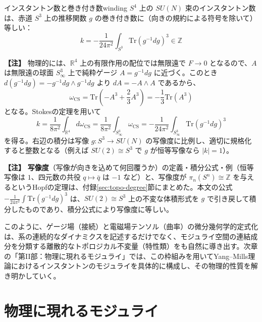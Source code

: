 \documentclass[uplatex, dvipdfmx, book]{jsbook}
\newenvironment{note}{\vspace{1ex}\par\footnotesize\noindent\textbf{【注】}}{\par\vspace{1ex}}
\begin{document}
\begin{myprop}{インスタントン数と巻き付き数}{winding}
$S^4$ 上の $SU(N)$ 束のインスタントン数は、赤道 $S^3$ 上の推移関数 $g$ の巻き付き数に（向きの規約による符号を除いて）等しい：
\begin{equation*}
    k = -\frac{1}{24\pi^2}\int_{S^3} \mathrm{Tr}\left( g^{-1}dg \right)^3 \in \mathbb{Z}
\end{equation*}
\end{myprop}

\begin{note}
物理的には、$\mathbb{R}^4$ 上の有限作用の配位では無限遠で $F \to 0$ となるので、$A$ は無限遠の球面 $S^3_\infty$ 上で純粋ゲージ $A = g^{-1}dg$ に近づく。このとき $d(g^{-1}dg) = -g^{-1}dg \wedge g^{-1}dg$ より $dA = -A \wedge A$ であるから、
\begin{equation*}
    \omega_{\text{CS}} = \mathrm{Tr}\left( -A^3 + \frac{2}{3}A^3 \right) = -\frac{1}{3}\mathrm{Tr}(A^3)
\end{equation*}
となる。Stokesの定理を用いて
\begin{equation*}
    k = \frac{1}{8\pi^2}\int_{\mathbb{R}^4} d\omega_{\text{CS}} = \frac{1}{8\pi^2}\int_{S^3_\infty} \omega_{\text{CS}} = -\frac{1}{24\pi^2}\int_{S^3_\infty} \mathrm{Tr}\left(g^{-1}dg\right)^3
\end{equation*}
を得る。右辺の積分は写像 $g: S^3 \to SU(N)$ の写像度に比例し、適切に規格化すると整数となる（例えば $SU(2) \cong S^3$ で $g$ が恒等写像なら $|k| = 1$）。
\end{note}

\begin{note}
\textbf{写像度}（写像が向きを込めて何回覆うか）の定義・積分公式・例（恒等写像は $1$、四元数の共役 $q \mapsto \bar{q}$ は $-1$ など）と、写像度が $\pi_n(S^n) \cong \mathbb{Z}$ を与えるというHopfの定理は、付録\ref{sec:topo-degree}節にまとめた。本文の公式 $-\frac{1}{24\pi^2}\int \mathrm{Tr}(g^{-1}dg)^3$ は、$SU(2) \cong S^3$ 上の不変な体積形式を $g$ で引き戻して積分したものであり、積分公式により写像度に等しい。
\end{note}

このように、ゲージ場（接続）と電磁場テンソル（曲率）の微分幾何学的定式化は、系の連続的なダイナミクスを記述するだけでなく、モジュライ空間の連結成分を分類する離散的なトポロジカル不変量（特性類）をも自然に導き出す。次章の「第II部：物理に現れるモジュライ」では、この枠組みを用いてYang--Mills理論におけるインスタントンのモジュライを具体的に構成し、その物理的性質を解き明かしていく。
\part{物理に現れるモジュライ}
\end{document}
